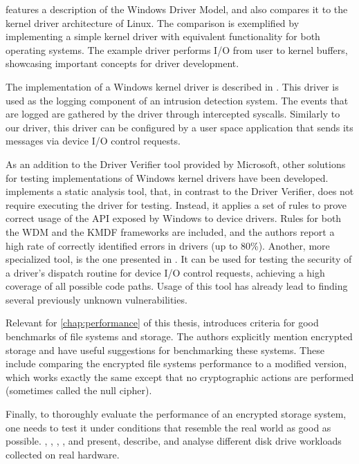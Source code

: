 \cite{Tsegaye2004} features a description of the Windows Driver Model, and also compares it to the kernel driver architecture of Linux. The comparison is exemplified by implementing a simple kernel driver with equivalent functionality for both operating systems. The example driver performs I/O from user to kernel buffers, showcasing important concepts for driver development.

The implementation of a Windows kernel driver is described in \cite{Battistoni2008}. This driver is used as the logging component of an intrusion detection system. The events that are logged are gathered by the driver through intercepted syscalls. Similarly to our driver, this driver can be configured by a user space application that sends its messages via device I/O control requests.

As an addition to the Driver Verifier tool provided by Microsoft, other solutions for testing implementations of Windows kernel drivers have been developed. \cite{Ball2006} implements a static analysis tool, that, in contrast to the Driver Verifier, does not require executing the driver for testing. Instead, it applies a set of rules to prove correct usage of the API exposed by Windows to device drivers. Rules for both the WDM and the KMDF frameworks are included, and the authors report a high rate of correctly identified errors in drivers (up to 80\%). Another, more specialized tool, is the one presented in \cite{Ni2012}. It can be used for testing the security of a driver's dispatch routine for device I/O control requests, achieving a high coverage of all possible code paths. Usage of this tool has already lead to finding several previously unknown vulnerabilities.

Relevant for \autoref{chap:performance} of this thesis, \cite{Traeger2008} introduces criteria for good benchmarks of file systems and storage. The authors explicitly mention encrypted storage and have useful suggestions for benchmarking these systems. These include comparing the encrypted file systems performance to a modified version, which works exactly the same except that no cryptographic actions are performed (sometimes called the null cipher).

Finally, to thoroughly evaluate the performance of an encrypted storage system, one needs to test it under conditions that resemble the real world as good as possible. \cite{Riska2006}, \cite{Riska2006a}, \cite{Leung2008}, \cite{Riska2009}, and \cite{Sehgal2010}  present, describe, and analyse different disk drive workloads collected on real hardware.

